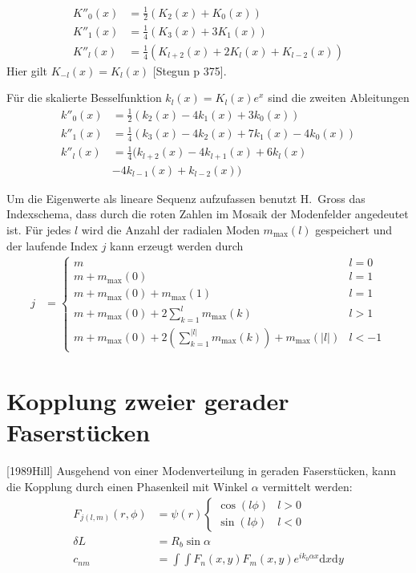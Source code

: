 \documentclass[DIV19,twocolumn]{scrartcl}
\def\({\left(}
\def\){\right)}
\newcommand{\mmax}{m_\textrm{max}}
\begin{document}
\begin{align}
  K''_0(x) &= \frac{1}{2}\(K_2(x)+K_0(x)\)\\
  K''_1(x) &= \frac{1}{4}\(K_3(x)+3K_1(x)\)\\
  K''_l(x) &= \frac{1}{4}\(K_{l+2}(x)+2K_l(x)+K_{l-2}(x)\)
\end{align}
Hier gilt $K_{-l}(x) = K_l(x)$ [Stegun p 375]. 

F\"ur die skalierte Besselfunktion $k_l(x)=K_l(x)e^x$ sind die zweiten Ableitungen
\begin{align}
  k''_0(x) &= \frac{1}{2}\(k_2(x)-4k_1(x)+3k_0(x)\)\\
  k''_1(x) &= \frac{1}{4}\(k_3(x)-4k_2(x)+7k_1(x)-4k_0(x)\)\\
  k''_l(x) &= \frac{1}{4}\big(k_{l+2}(x)-4k_{l+1}(x)+6k_l(x) \nonumber \\ 
&  -4k_{l-1}(x)+k_{l-2}(x)\big)
\end{align}


Um die Eigenwerte als lineare Sequenz aufzufassen benutzt H.~Gross das
Indexschema, dass durch die roten Zahlen im Mosaik der Modenfelder
angedeutet ist. F\"ur jedes $l$ wird die Anzahl der radialen Moden
$\mmax(l)$ gespeichert und der laufende Index $j$ kann erzeugt werden
durch
\begin{align}
  j &= \begin{cases}
    m & l=0\\
    m+\mmax(0) & l=1\\
    m+\mmax(0)+\mmax(1) & l=1\\
    m+\mmax(0)+ 2\sum_{k=1}^l \mmax(k) & l>1 \\
    m+\mmax(0)+ 2\(\sum_{k=1}^{|l|} \mmax(k)\) + \mmax(|l|) & l<-1
\end{cases}
\end{align}

\section{Kopplung zweier gerader Faserst\"ucken}
[1989Hill]
Ausgehend von einer Modenverteilung in geraden Faserst\"ucken, kann
die Kopplung durch einen Phasenkeil mit Winkel $\alpha$ vermittelt
werden:
\begin{align}
  F_{j(l,m)}(r,\phi) &= \psi(r) 
  \begin{cases}
    \cos(l \phi) & l>0\\  
    \sin(l \phi) & l<0
  \end{cases} \\
  \delta L &= R_b \sin\alpha\\
  c_{nm}&=\int\!\!\!\int\! F_n(x,y)F_m(x,y) e^{ik_0\alpha x} \textrm{d}x \textrm{d}y
\end{align}
\end{document}
